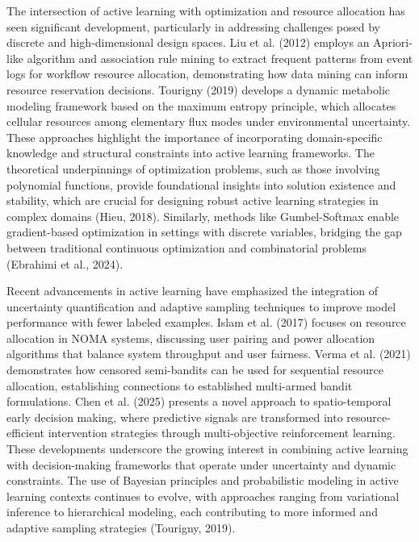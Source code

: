 The intersection of active learning with optimization and resource allocation has seen significant development, particularly in addressing challenges posed by discrete and high-dimensional design spaces. Liu et al. (2012) employs an Apriori-like algorithm and association rule mining to extract frequent patterns from event logs for workflow resource allocation, demonstrating how data mining can inform resource reservation decisions. Tourigny (2019) develops a dynamic metabolic modeling framework based on the maximum entropy principle, which allocates cellular resources among elementary flux modes under environmental uncertainty. These approaches highlight the importance of incorporating domain-specific knowledge and structural constraints into active learning frameworks. The theoretical underpinnings of optimization problems, such as those involving polynomial functions, provide foundational insights into solution existence and stability, which are crucial for designing robust active learning strategies in complex domains (Hieu, 2018). Similarly, methods like Gumbel-Softmax enable gradient-based optimization in settings with discrete variables, bridging the gap between traditional continuous optimization and combinatorial problems (Ebrahimi et al., 2024).

Recent advancements in active learning have emphasized the integration of uncertainty quantification and adaptive sampling techniques to improve model performance with fewer labeled examples. Islam et al. (2017) focuses on resource allocation in NOMA systems, discussing user pairing and power allocation algorithms that balance system throughput and user fairness. Verma et al. (2021) demonstrates how censored semi-bandits can be used for sequential resource allocation, establishing connections to established multi-armed bandit formulations. Chen et al. (2025) presents a novel approach to spatio-temporal early decision making, where predictive signals are transformed into resource-efficient intervention strategies through multi-objective reinforcement learning. These developments underscore the growing interest in combining active learning with decision-making frameworks that operate under uncertainty and dynamic constraints. The use of Bayesian principles and probabilistic modeling in active learning contexts continues to evolve, with approaches ranging from variational inference to hierarchical modeling, each contributing to more informed and adaptive sampling strategies (Tourigny, 2019).

